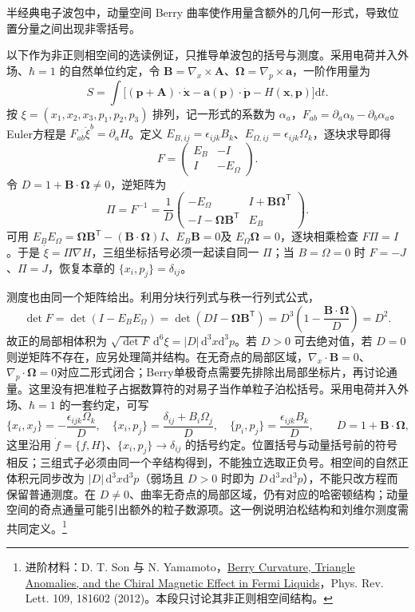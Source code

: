 \documentclass[UTF8,zihao=-4,fontset=fandol,a4paper]{ctexart}
\newcommand{\vect}[1]{\bm{#1}}\newcommand{\dd}{\mathrm d}\newcommand{\pd}{\partial}
\begin{document}
半经典电子波包中，动量空间 Berry 曲率使作用量含额外的几何一形式，导致位置分量之间出现非零括号。

以下作为非正则相空间的选读例证，只推导单波包的括号与测度。采用电荷并入外场、$\hbar=1$ 的自然单位约定，令 $\vect B=\nabla_x\times\vect A$、$\vect\Omega=\nabla_p\times\vect a$，一阶作用量为
\[
S=\int\bigl[(\vect p+\vect A)\cdot\dot{\vect x}
-\vect a(\vect p)\cdot\dot{\vect p}-H(\vect x,\vect p)\bigr]\dd t.
\]
按 $\xi=(x_1,x_2,x_3,p_1,p_2,p_3)$ 排列，记一形式的系数为 $\alpha_a$，$F_{ab}=\partial_a\alpha_b-\partial_b\alpha_a$。Euler方程是 $F_{ab}\dot\xi^b=\partial_aH$。定义 $E_{B,ij}=\epsilon_{ijk}B_k$、$E_{\Omega,ij}=\epsilon_{ijk}\Omega_k$，逐块求导即得
\[
F=\begin{pmatrix}E_B&-I\\I&-E_\Omega\end{pmatrix}.
\]
令 $D=1+\vect B\cdot\vect\Omega\ne0$，逆矩阵为
\[
\Pi=F^{-1}=\frac1D
\begin{pmatrix}
-E_\Omega&I+\vect B\vect\Omega^{\mathsf T}\\
-I-\vect\Omega\vect B^{\mathsf T}&E_B
\end{pmatrix}.
\]
可用 $E_BE_\Omega=\vect\Omega\vect B^{\mathsf T}-(\vect B\cdot\vect\Omega)I$、$E_B\vect B=0$及 $E_\Omega\vect\Omega=0$，逐块相乘检查 $F\Pi=I$。于是 $\dot\xi=\Pi\nabla H$，三组坐标括号必须一起读自同一 $\Pi$；当 $B=\Omega=0$ 时 $F=-J$、$\Pi=J$，恢复本章的 $\{x_i,p_j\}=\delta_{ij}$。

测度也由同一个矩阵给出。利用分块行列式与秩一行列式公式，
\[
\det F=\det(I-E_BE_\Omega)
=\det(DI-\vect\Omega\vect B^{\mathsf T})
=D^3\left(1-\frac{\vect B\cdot\vect\Omega}{D}\right)=D^2.
\]
故正的局部相体积为 $\sqrt{\det F}\,\dd^6\xi=|D|\,\dd^3x\dd^3p$。若 $D>0$ 可去绝对值，若 $D=0$ 则逆矩阵不存在，应另处理简并结构。在无奇点的局部区域，$\nabla_x\cdot\vect B=0$、$\nabla_p\cdot\vect\Omega=0$对应二形式闭合；Berry单极奇点需要先排除出局部坐标片，再讨论通量。这里没有把准粒子占据数算符的对易子当作单粒子泊松括号。采用电荷并入外场、$\hbar=1$ 的一套约定，可写
\[
\{x_i,x_j\}=-\frac{\epsilon_{ijk}\Omega_k}{D},\quad
\{x_i,p_j\}=\frac{\delta_{ij}+B_i\Omega_j}{D},\quad
\{p_i,p_j\}=\frac{\epsilon_{ijk}B_k}{D},\qquad D=1+\vect B\cdot\vect\Omega,
\]
这里沿用 $\dot f=\{f,H\}$、$\{x_i,p_j\}\to\delta_{ij}$ 的括号约定。位置括号与动量括号前的符号相反；三组式子必须由同一个辛结构得到，不能独立选取正负号。相空间的自然正体积元同步改为 $|D|\,\dd^3x\dd^3p$（弱场且 $D>0$ 时即为 $D\,\dd^3x\dd^3p$），不能只改方程而保留普通测度。在 $D\ne0$、曲率无奇点的局部区域，仍有对应的哈密顿结构；动量空间的奇点通量可能引出额外的粒子数源项。这一例说明泊松结构和刘维尔测度需共同定义。\footnote{进阶材料：D. T. Son 与 N. Yamamoto，\href{https://arxiv.org/abs/1203.2697}{Berry Curvature, Triangle Anomalies, and the Chiral Magnetic Effect in Fermi Liquids}，Phys. Rev. Lett. 109, 181602 (2012)。本段只讨论其非正则相空间结构。}
\end{document}

